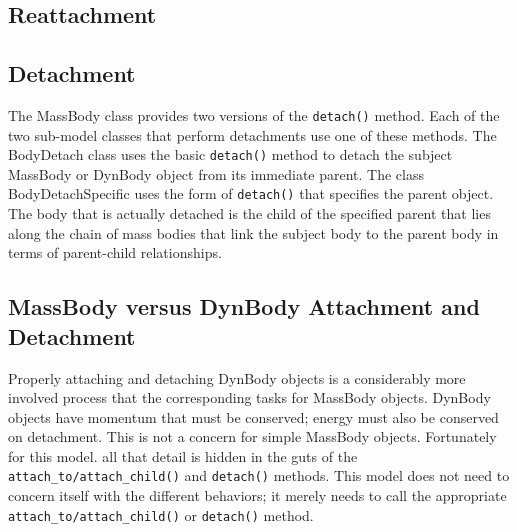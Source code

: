 \subsection{Reattachment}

\subsection{Detachment}
The MassBody class provides two versions of the {\tt detach()} method.
Each of the two sub-model classes that perform detachments use one
of these methods. The BodyDetach class uses the basic {\tt detach()}
method to detach the subject MassBody or DynBody object from its immediate parent.
The class BodyDetachSpecific uses the form of {\tt detach()}
that specifies the parent object. The body that is actually detached
is the child of the specified parent that lies along the chain of mass bodies
that link the subject body to the parent body in terms of parent-child
relationships.

\subsection{MassBody versus DynBody Attachment and Detachment}
Properly attaching and detaching DynBody objects is a considerably more
involved process that the corresponding tasks for MassBody objects.
DynBody objects have momentum that must be conserved; energy must also
be conserved on detachment. This is not a concern for simple MassBody objects.
Fortunately for this model. all that detail is hidden in the guts of the
{\tt attach\_to/attach\_child()} and {\tt detach()} methods. This model does not need to concern
itself with the different behaviors; it merely needs to call the appropriate
{\tt attach\_to/attach\_child()} or {\tt detach()} method.
